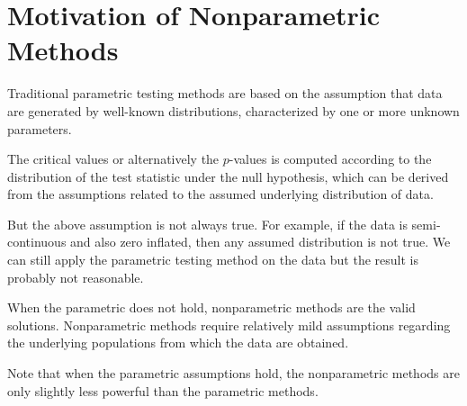 \section{Motivation of Nonparametric Methods}
Traditional parametric testing methods are based on the
assumption that data are generated by well-known distributions,
characterized by one or more unknown parameters.

The critical values or alternatively the $p$-values is computed
according to the distribution of the test statistic under the null
hypothesis, which can be derived from the assumptions related
to the assumed underlying distribution of data.

But the above assumption is not always true. For example, if the data is semi-continuous and also zero inflated, then any assumed distribution is not true. We can still apply the parametric testing method on the data but the result is probably not reasonable.

When the parametric does not hold, nonparametric methods are the valid solutions. Nonparametric methods require relatively mild assumptions
regarding the underlying populations from which the data are
obtained.

Note that when the parametric assumptions hold, the nonparametric
methods are only slightly less powerful than the parametric
methods.


